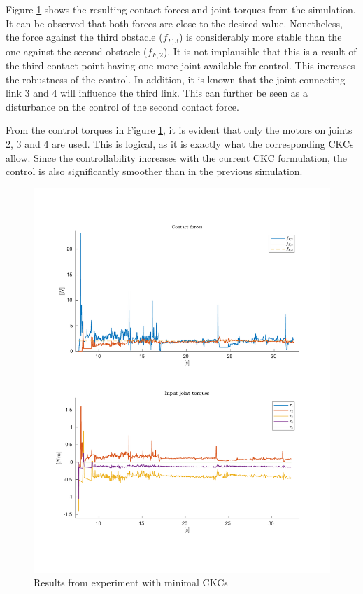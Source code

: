 Figure \ref{fig:2xf-miniJ} shows the resulting contact forces and joint torques from the simulation. It can be observed that both forces are close to the desired value. Nonetheless, the force against the third obstacle ($f_{F,3}$) is considerably more stable than the one against the second obstacle ($f_{F,2}$). It is not implausible that this is a result of the third contact point having one more joint available for control. This increases the robustness of the control. In addition, it is known that the joint connecting link 3 and 4 will influence the third link. This can further be seen as a disturbance on the control of the second contact force.

From the control torques in Figure \ref{fig:2xf-miniJ}, it is evident that only the motors on joints 2, 3 and 4 are used. This is logical, as it is exactly what the corresponding CKCs allow. Since the controllability increases with the current CKC formulation, the control is also significantly smoother than in the previous simulation.

\begin{figure}[H]
    \centering
    \includegraphics[trim=1.5cm 2cm 2cm 2cm, clip=true, width=\textwidth]{figures/experiments/2xf/miniJ-2plot.pdf}
    \caption{Results from experiment with minimal CKCs}
    \label{fig:2xf-miniJ}
\end{figure}




